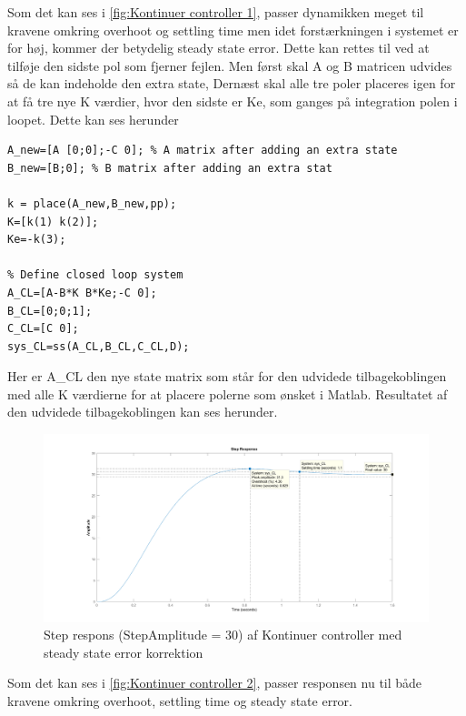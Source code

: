 Som det kan ses i \autoref{fig:Kontinuer controller 1}, passer dynamikken meget til kravene omkring overhoot og settling time men idet forstærkningen i systemet er for høj, kommer der  betydelig steady state error. Dette kan rettes til ved at tilføje den sidste pol som fjerner fejlen. Men først skal A og B matricen udvides så de kan indeholde den extra state, Dernæst skal alle tre poler placeres igen for at få tre nye K værdier, hvor den sidste er Ke, som ganges på integration polen i loopet. Dette kan ses herunder

\begin{lstlisting}[frame=single]
% Find feedback gains for the desired poles
A_new=[A [0;0];-C 0]; % A matrix after adding an extra state
B_new=[B;0]; % B matrix after adding an extra stat

k = place(A_new,B_new,pp);
K=[k(1) k(2)];
Ke=-k(3);

% Define closed loop system
A_CL=[A-B*K B*Ke;-C 0];
B_CL=[0;0;1];
C_CL=[C 0];
sys_CL=ss(A_CL,B_CL,C_CL,D);
\end{lstlisting}

Her er A\_CL den nye state matrix som står for den udvidede tilbagekoblingen med alle K værdierne for at placere polerne som ønsket i Matlab. Resultatet af den udvidede tilbagekoblingen kan ses herunder. 

\begin{figure}[H]
	\centering
	\includegraphics[width = 1\textwidth]{figur/Step_continues_2}
	\caption{Step respons (StepAmplitude = 30) af Kontinuer controller med steady state error korrektion}
	\label{fig:Kontinuer controller 2}
\end{figure}

Som det kan ses i \autoref{fig:Kontinuer controller 2}, passer responsen nu til både kravene omkring overhoot, settling time og steady state error.




